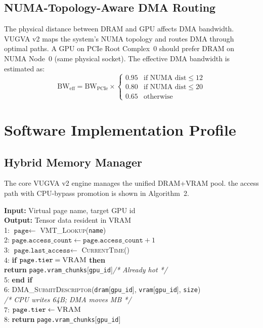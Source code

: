 \documentclass[11pt,twocolumn]{article}
\begin{document}
\subsection{NUMA-Topology-Aware DMA Routing}
The physical distance between DRAM and GPU affects DMA bandwidth. VUGVA v2 maps the system's NUMA topology and routes DMA through optimal paths. A GPU on PCIe Root Complex~0 should prefer DRAM on NUMA Node~0 (same physical socket). The effective DMA bandwidth is estimated as:
\begin{equation}
\text{BW}_{\text{eff}} = \text{BW}_{\text{PCIe}} \times \begin{cases} 0.95 & \text{if NUMA dist} \leq 12 \\ 0.80 & \text{if NUMA dist} \leq 20 \\ 0.65 & \text{otherwise} \end{cases}
\end{equation}

\section{Software Implementation Profile}
\label{sec:implementation}

\subsection{Hybrid Memory Manager}

The core VUGVA v2 engine manages the unified DRAM+VRAM pool. the access path with CPU-bypass promotion is shown in Algorithm~2.

\begin{tcolorbox}[colback=codebg, colframe=vugvagreen, title={\textbf{Algorithm 2:} VUGVA v2 Hybrid Memory Access (CPU Bypass)}, fonttitle=\small]
\small\ttfamily
\textbf{Input:} Virtual page name, target GPU id\\
\textbf{Output:} Tensor data resident in VRAM\\[4pt]
1: $\texttt{page} \leftarrow$ \textsc{VMT\_Lookup}(\texttt{name})\\
2: $\texttt{page.access\_count} \leftarrow \texttt{page.access\_count} + 1$\\
3: $\texttt{page.last\_access} \leftarrow$ \textsc{CurrentTime}()\\
4: \textbf{if} $\texttt{page.tier} = \textsc{VRAM}$ \textbf{then}\\
\phantom{4: }\textbf{return} \texttt{page.vram\_chunks}[\texttt{gpu\_id}]\hfill{\textit{/* Already hot */}}\\
5: \textbf{end if}\\
6: \textsc{DMA\_SubmitDescriptor}(\texttt{dram}[\texttt{gpu\_id}], \texttt{vram}[\texttt{gpu\_id}], \texttt{size})\\
\phantom{6: }\hfill{\textit{/* CPU writes 64B; DMA moves MB */}}\\
7: $\texttt{page.tier} \leftarrow \textsc{VRAM}$\\
8: \textbf{return} \texttt{page.vram\_chunks}[\texttt{gpu\_id}]
\end{tcolorbox}
\end{document}
